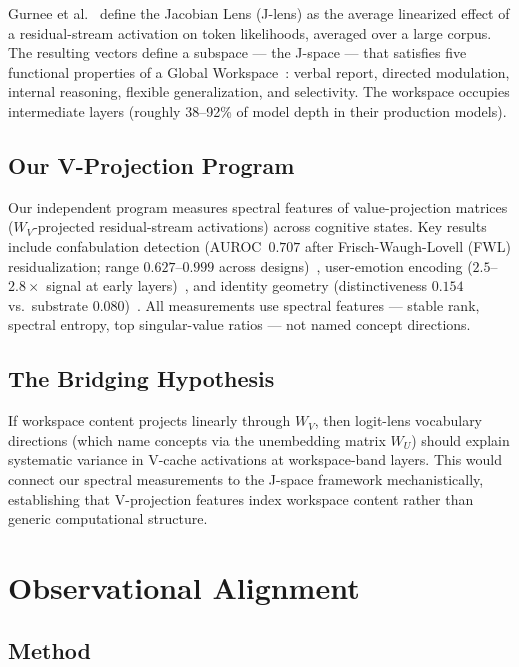 \documentclass[11pt,a4paper]{article}
\begin{document}
Gurnee et al.~\citep{gurnee2026gwt} define the Jacobian Lens (J-lens)
as the average linearized effect of a residual-stream activation on
token likelihoods, averaged over a large corpus. The resulting vectors
define a subspace --- the J-space --- that satisfies five functional
properties of a Global Workspace~\citep{baars1988cognitive}: verbal
report, directed modulation, internal reasoning, flexible
generalization, and selectivity. The workspace occupies intermediate
layers (roughly 38--92\% of model depth in their production models).

\subsection{Our V-Projection Program}

Our independent program measures spectral features of value-projection
matrices ($W_V$-projected residual-stream activations) across cognitive
states. Key results include confabulation detection (AUROC~$0.707$
after Frisch-Waugh-Lovell (FWL) residualization; range $0.627$--$0.999$ across
designs)~\citep{lyra2026decision}, user-emotion encoding
($2.5$--$2.8\times$ signal at early
layers)~\citep{lyra2026weather}, and identity geometry
(distinctiveness $0.154$ vs.\ substrate
$0.080$)~\citep{lyra2026identity}. All measurements use spectral
features --- stable rank, spectral entropy, top singular-value ratios
--- not named concept directions.

\subsection{The Bridging Hypothesis}

If workspace content projects linearly through $W_V$, then logit-lens
vocabulary directions (which name concepts via the unembedding matrix
$W_U$) should explain systematic variance in V-cache activations at
workspace-band layers. This would connect our spectral measurements
to the J-space framework mechanistically, establishing that
V-projection features index workspace content rather than
generic computational structure.

\section{Observational Alignment}
\label{sec:observational}

\subsection{Method}
\end{document}
